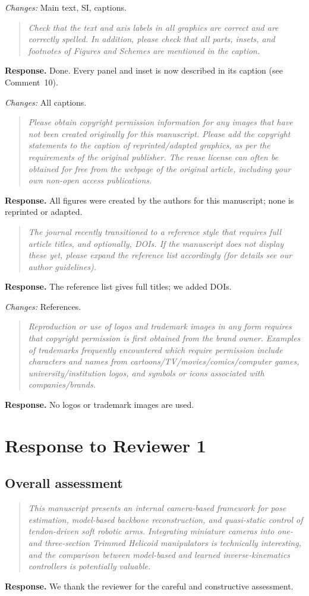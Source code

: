 \documentclass[11pt,a4paper]{article}
\newcommand{\rc}[1]{\begin{quote}\color{black!70}\itshape #1\end{quote}}
\begin{document}
\textit{Changes:} Main text, SI, captions.

\rc{Check that the text and axis labels in all graphics are correct and are correctly spelled. In addition, please check that all parts, insets, and footnotes of Figures and Schemes are mentioned in the caption.}
\textbf{Response.} Done. Every panel and inset is now described in its caption (see Comment~10).

\textit{Changes:} All captions.

\rc{Please obtain copyright permission information for any images that have not been created originally for this manuscript. Please add the copyright statements to the caption of reprinted/adapted graphics, as per the requirements of the original publisher. The reuse license can often be obtained for free from the webpage of the original article, including your own non-open access publications.}
\textbf{Response.} All figures were created by the authors for this manuscript; none is reprinted or adapted.

\rc{The journal recently transitioned to a reference style that requires full article titles, and optionally, DOIs. If the manuscript does not display these yet, please expand the reference list accordingly (for details see our author guidelines).}
\textbf{Response.} The reference list gives full titles; we added DOIs.

\textit{Changes:} References.

\rc{Reproduction or use of logos and trademark images in any form requires that copyright permission is first obtained from the brand owner. Examples of trademarks frequently encountered which require permission include characters and names from cartoons/TV/movies/comics/computer games, university/institution logos, and symbols or icons associated with companies/brands.}
\textbf{Response.} No logos or trademark images are used.

\section*{Response to Reviewer 1}

\subsection*{Overall assessment}

\rc{This manuscript presents an internal camera-based framework for pose estimation, model-based backbone reconstruction, and quasi-static control of tendon-driven soft robotic arms. Integrating miniature cameras into one- and three-section Trimmed Helicoid manipulators is technically interesting, and the comparison between model-based and learned inverse-kinematics controllers is potentially valuable.}
\textbf{Response.} We thank the reviewer for the careful and constructive assessment.
\end{document}
